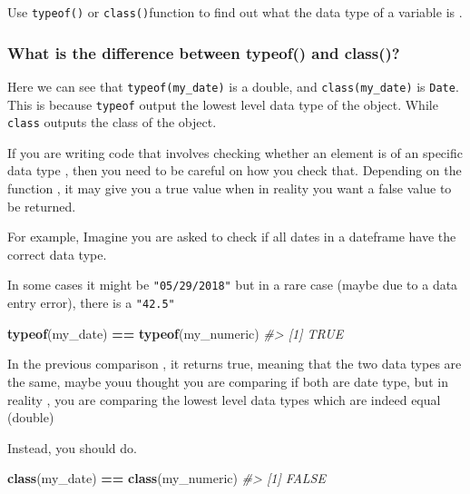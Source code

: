 \documentclass[
]{book}
\newenvironment{Shaded}{\begin{snugshade}}{\end{snugshade}}
\newcommand{\CommentTok}[1]{\textcolor[rgb]{0.56,0.35,0.01}{\textit{#1}}}
\newcommand{\FunctionTok}[1]{\textcolor[rgb]{0.13,0.29,0.53}{\textbf{#1}}}
\newcommand{\NormalTok}[1]{#1}
\newcommand{\SpecialCharTok}[1]{\textcolor[rgb]{0.81,0.36,0.00}{\textbf{#1}}}
\begin{document}
Use \texttt{typeof()} or \texttt{class()}function to find out what the data type of a variable is .

\subsubsection*{What is the difference between typeof() and class()?}\label{what-is-the-difference-between-typeof-and-class}

Here we can see that \texttt{typeof(my\_date)} is a double, and \texttt{class(my\_date)} is \texttt{Date}. This is because \texttt{typeof} output the lowest level data type of the object. While \texttt{class} outputs the class of the object.

If you are writing code that involves checking whether an element is of an specific data type , then you need to be careful on how you check that. Depending on the function , it may give you a true value when in reality you want a false value to be returned.

For example, Imagine you are asked to check if all dates in a dateframe have the correct data type.

In some cases it might be \texttt{"05/29/2018"} but in a rare case (maybe due to a data entry error), there is a \texttt{"42.5"}

\begin{Shaded}
\begin{Highlighting}[]
\FunctionTok{typeof}\NormalTok{(my\_date) }\SpecialCharTok{==} \FunctionTok{typeof}\NormalTok{(my\_numeric)}
\CommentTok{\#\textgreater{} [1] TRUE}
\end{Highlighting}
\end{Shaded}

In the previous comparison , it returns true, meaning that the two data types are the same, maybe youu thought you are comparing if both are date type, but in reality , you are comparing the lowest level data types which are indeed equal (double)

Instead, you should do.

\begin{Shaded}
\begin{Highlighting}[]
\FunctionTok{class}\NormalTok{(my\_date) }\SpecialCharTok{==} \FunctionTok{class}\NormalTok{(my\_numeric)}
\CommentTok{\#\textgreater{} [1] FALSE}
\end{Highlighting}
\end{Shaded}
\end{document}
